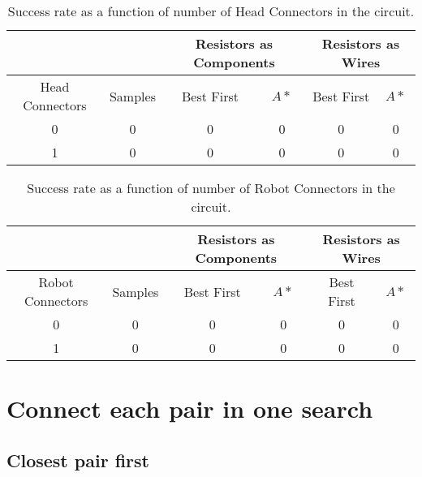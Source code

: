 \begin{table}[H]
\begin{center}
\begin{singlespace}
\begin{tabular}{| c | c || c | c | c | c |}
\hline
 & & \multicolumn{2}{|c|}{Resistors as Components} & \multicolumn{2}{|c|}{
 Resistors as Wires} \\
\hline
Head Connectors & Samples & Best First & $A*$ & Best First & $A*$ \\
\hline\hline
0 & 0 & 0 & 0 & 0 & 0 \\
1 & 0 & 0 & 0 & 0 & 0 \\
\hline
\end{tabular}
\end{singlespace}
\end{center}
\caption{Success rate as a function of number of Head Connectors in the circuit.}
\end{table}

\begin{table}[H]
\begin{center}
\begin{singlespace}
\begin{tabular}{| c | c || c | c | c | c |}
\hline
 & & \multicolumn{2}{|c|}{Resistors as Components} & \multicolumn{2}{|c|}{
 Resistors as Wires} \\
\hline
Robot Connectors & Samples & Best First & $A*$ & Best First & $A*$ \\
\hline\hline
0 & 0 & 0 & 0 & 0 & 0 \\
1 & 0 & 0 & 0 & 0 & 0 \\
\hline
\end{tabular}
\end{singlespace}
\end{center}
\caption{Success rate as a function of number of Robot Connectors in the circuit.}
\end{table}

\section{Connect each pair in one search}
\label{sec:per_pair}

\subsection{Closest pair first}

